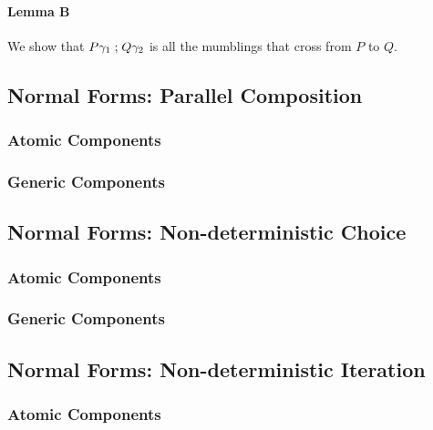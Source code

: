 \paragraph{Lemma B}
We show that $P\gamma_1 \mathrel{;} Q\gamma_2$
is all the mumblings that cross from $P$ to $Q$.



\subsection{Normal Forms: Parallel Composition}

\subsubsection{Atomic Components}

\subsubsection{Generic Components}

\subsection{Normal Forms: Non-deterministic Choice}

\subsubsection{Atomic Components}

\subsubsection{Generic Components}

\subsection{Normal Forms: Non-deterministic Iteration}

\subsubsection{Atomic Components}

